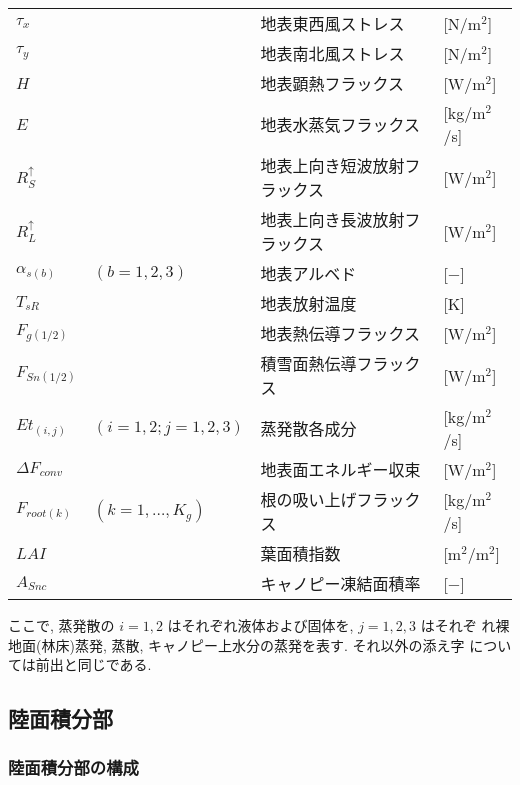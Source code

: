 \begin{tabular}{llll}
$\tau_x$       &                     & 地表東西風ストレス & [N/m$^2$] \\
$\tau_y$       &                     & 地表南北風ストレス & [N/m$^2$] \\
$H$            &                     & 地表顕熱フラックス & [W/m$^2$] \\
$E$            &                     & 地表水蒸気フラックス & [kg/m$^2$/s] \\
$R^{\uparrow}_S$ &                  & 地表上向き短波放射フラックス & [W/m$^2$]\\
$R^{\uparrow}_L$ &                  & 地表上向き長波放射フラックス & [W/m$^2$]\\
$\alpha_{s(b)}$ & $(b=1,2,3)$         & 地表アルベド   & [$-$] \\
$T_{sR}$      &                     & 地表放射温度   & [K]   \\
$F_{g(1/2)}$      &                     & 地表熱伝導フラックス & [W/m$^2$] \\
$F_{Sn(1/2)}$     &                     & 積雪面熱伝導フラックス & [W/m$^2$] \\
$Et_{(i,j)}$   & $(i=1,2;j=1,2,3)$   & 蒸発散各成分   & [kg/m$^2$/s] \\
$\Delta F_{conv}$&                     & 地表面エネルギー収束 & [W/m$^2$] \\
$F_{root(k)}$      & $(k=1,\ldots,K_g)$  & 根の吸い上げフラックス & [kg/m$^2$/s] \\
$LAI$          &                     & 葉面積指数 & [m$^2$/m$^2$] \\
$A_{Snc}$     &                     & キャノピー凍結面積率 & [$-$] \\
\end{tabular}
\medskip

ここで, 蒸発散の $i=1,2$ はそれぞれ液体および固体を, $j=1,2,3$ はそれぞ
れ裸地面(林床)蒸発, 蒸散, キャノピー上水分の蒸発を表す. それ以外の添え字
については前出と同じである.

\subsection{陸面積分部}

\subsubsection{陸面積分部の構成}

